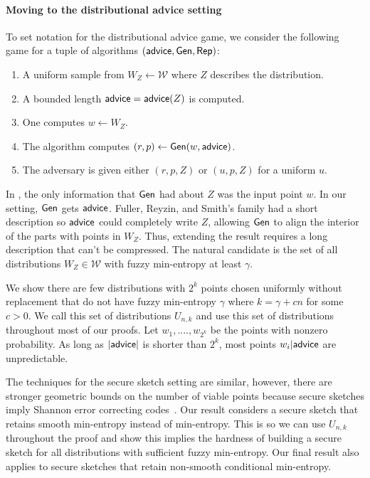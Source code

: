 \paragraph{Moving to the distributional advice setting}
To set notation for the distributional advice game, we consider the following game for a tuple of algorithms $({\mathsf{advice}}, {\mathsf{Gen}}, {\mathsf{Rep}})$:
\begin{enumerate}
\itemsep0em
\item A uniform sample from $W_Z \leftarrow \mathcal{W}$ where $Z$ describes the distribution. 
\item A bounded length ${\mathsf{advice}} = {\mathsf{advice}}(Z)$ is computed.
\item One computes $w\leftarrow W_Z$.
\item The algorithm computes $(r, p)\leftarrow {\ensuremath{\mathsf{Gen}}}(w, {\mathsf{advice}})$.
\item The adversary is given either $(r, p, Z)$ or $(u, p, Z)$ for a uniform $u$. 
\end{enumerate}

In \cite{fuller2020fuzzy}, the only information that ${\mathsf{Gen}}$ had about $Z$ was the input point $w$.  In our setting, ${\mathsf{Gen}}$ gets ${\mathsf{advice}}$.  Fuller, Reyzin, and Smith's family had a short description so ${\mathsf{advice}}$ could completely write $Z$, allowing ${\mathsf{Gen}}$ to align the interior of the parts with points in $W_Z$.  Thus, extending the result requires a long description that can't be compressed.  The natural candidate is the set of all distributions $W_Z\in\mathcal{W}$ with fuzzy min-entropy at least $\gamma$. 

We show there are few distributions with $2^k$ points chosen uniformly without replacement that do not have fuzzy min-entropy $\gamma$ where $k = \gamma +cn$ for some $c>0$.  We call this set of distributions $U_{n,k}$ and use this set of distributions throughout most of our proofs. Let $w_1,...., w_{2^k}$ be the points with nonzero probability.  As long as $|{\mathsf{advice}}|$ is shorter than $2^k$, most points $w_i | {\mathsf{advice}}$ are unpredictable.  %

The techniques for the secure sketch setting are similar, however, there are stronger geometric bounds on the number of viable points because secure sketches imply Shannon error correcting codes~\cite{dodis2008fuzzy,fuller2020computational}.  Our result considers a secure sketch that retains smooth min-entropy instead of min-entropy.  This is so we can use $U_{n,k}$ throughout the proof and show this implies the hardness of building a secure sketch for all distributions with sufficient fuzzy min-entropy.  Our final result also applies to secure sketches that retain non-smooth conditional min-entropy.

